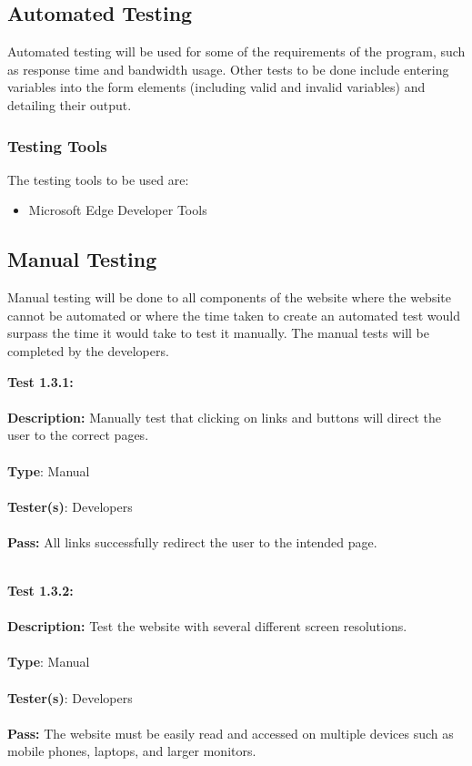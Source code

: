 \documentclass[12pt]{article}
\begin{document}
\subsection{Automated Testing}
Automated testing will be used for some of the requirements of the program, such as response time and bandwidth usage. Other tests to be done include entering variables into the form elements (including valid and invalid variables) and detailing their output.

\subsubsection{Testing Tools}
The testing tools to be used are:
\begin{itemize}
\item Microsoft Edge Developer Tools
\end{itemize}

\subsection{Manual Testing}
Manual testing will be done to all components of the website where the website cannot be automated or where the time taken to create an automated test would surpass the time it would take to test it manually. The manual tests will be completed by the developers.

\begin{tcolorbox}
\textbf{Test 1.3.1:} \\ \\
\textbf{Description:} Manually test that clicking on links and buttons will direct the user to the correct pages. \\ \\
\textbf{Type}: Manual \\ \\
\textbf{Tester(s)}: Developers \\ \\
\textbf{Pass:} All links successfully redirect the user to the intended page. \\ \\
\end{tcolorbox}

\begin{tcolorbox}
\textbf{Test 1.3.2:} \\ \\
\textbf{Description:} Test the website with several different screen resolutions. \\ \\
\textbf{Type}: Manual \\ \\
\textbf{Tester(s)}: Developers \\ \\
\textbf{Pass:} The website must be easily read and accessed on multiple devices such as mobile phones, laptops, and larger monitors. \\ \\
\end{tcolorbox}
\end{document}

